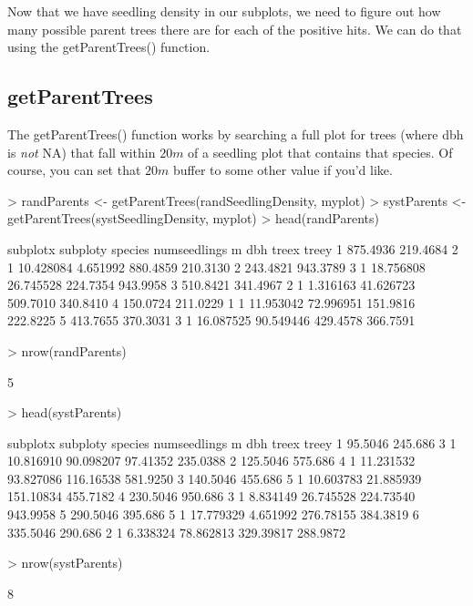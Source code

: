 \documentclass{article}
\begin{document}
Now that we have seedling density in our subplots, we need to figure out how many possible parent trees there are for each of the positive hits. We can do that using the getParentTrees() function.

\subsection{getParentTrees}

The getParentTrees() function works by searching a full plot for trees (where dbh is \textit{not} NA) that fall within $20 m$ of a seedling plot that contains that species. Of course, you can set that $20 m$ buffer to some other value if you'd like.

\begin{Schunk}
\begin{Sinput}
> randParents <- getParentTrees(randSeedlingDensity, myplot)
> systParents <- getParentTrees(systSeedlingDensity, myplot)
> head(randParents)
\end{Sinput}
\begin{Soutput}
  subplotx subploty species numseedlings         m       dbh    treex    treey
1 875.4936 219.4684       2            1 10.428084  4.651992 880.4859 210.3130
2 243.4821 943.3789       3            1 18.756808 26.745528 224.7354 943.9958
3 510.8421 341.4967       2            1  1.316163 41.626723 509.7010 340.8410
4 150.0724 211.0229       1            1 11.953042 72.996951 151.9816 222.8225
5 413.7655 370.3031       3            1 16.087525 90.549446 429.4578 366.7591
\end{Soutput}
\begin{Sinput}
> nrow(randParents)
\end{Sinput}
\begin{Soutput}
[1] 5
\end{Soutput}
\begin{Sinput}
> head(systParents)
\end{Sinput}
\begin{Soutput}
  subplotx subploty species numseedlings         m       dbh     treex    treey
1  95.5046  245.686       3            1 10.816910 90.098207  97.41352 235.0388
2 125.5046  575.686       4            1 11.231532 93.827086 116.16538 581.9250
3 140.5046  455.686       5            1 10.603783 21.885939 151.10834 455.7182
4 230.5046  950.686       3            1  8.834149 26.745528 224.73540 943.9958
5 290.5046  395.686       5            1 17.779329  4.651992 276.78155 384.3819
6 335.5046  290.686       2            1  6.338324 78.862813 329.39817 288.9872
\end{Soutput}
\begin{Sinput}
> nrow(systParents)
\end{Sinput}
\begin{Soutput}
[1] 8
\end{Soutput}
\end{Schunk}
\end{document}
